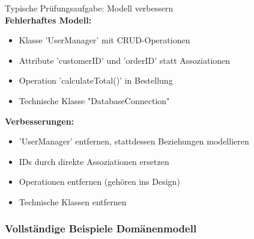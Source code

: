 \begin{example2}{Typische Prüfungsaufgabe: Modell verbessern}\\
\textbf{Fehlerhaftes Modell:}
\begin{itemize}
    \item Klasse 'UserManager' mit CRUD-Operationen
    \item Attribute 'customerID' und 'orderID' statt Assoziationen
    \item Operation 'calculateTotal()' in Bestellung
    \item Technische Klasse "DatabaseConnection"
\end{itemize}

\textbf{Verbesserungen:}
\begin{itemize}
    \item 'UserManager' entfernen, stattdessen Beziehungen modellieren
    \item IDs durch direkte Assoziationen ersetzen
    \item Operationen entfernen (gehören ins Design)
    \item Technische Klassen entfernen
\end{itemize}
\end{example2}

\subsubsection{Vollständige Beispiele Domänenmodell}

